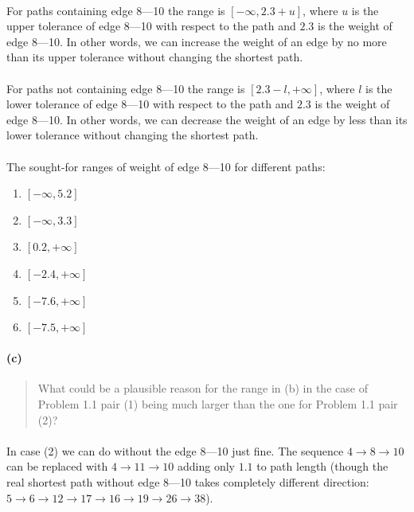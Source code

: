 \paragraph{}
For paths containing edge 8---10 the range is $[-\infty,2.3+u]$, where $u$ is the upper tolerance of edge 8---10 with respect to the path and $2.3$ is the weight of edge 8---10. In other words, we can increase the weight of an edge by no more than its upper tolerance without changing the shortest path.

\paragraph{}
For paths not containing edge 8---10 the range is $[2.3-l,+\infty]$, where $l$ is the lower tolerance of edge 8---10 with respect to the path and $2.3$ is the weight of edge 8---10. In other words, we can decrease the weight of an edge by less than its lower tolerance without changing the shortest path.

\paragraph{}
The sought-for ranges of weight of edge 8---10 for different paths:
\begin{enumerate}[(1)]
\item $ [-\infty, 5.2] $
\item $ [-\infty, 3.3] $
\item $ [0.2, +\infty] $
\item $ [-2.4, +\infty] $
\item $ [-7.6, +\infty] $
\item $ [-7.5, +\infty] $
\end{enumerate}

\paragraph{(c)}
\begin{quote}
What could be a plausible reason for the range in (b) in the case of Problem 1.1 pair (1) being much larger than the one for Problem 1.1 pair (2)?
\end{quote}

\paragraph{}
In case (2) we can do without the edge 8---10 just fine. The sequence $4 \rightarrow 8 \rightarrow 10$ can be replaced with $4 \rightarrow 11 \rightarrow 10$ adding only $1.1$ to path length (though the real shortest path without edge 8---10 takes completely different direction: $5 \rightarrow 6 \rightarrow 12 \rightarrow 17 \rightarrow 16 \rightarrow 19 \rightarrow 26 \rightarrow 38$).

